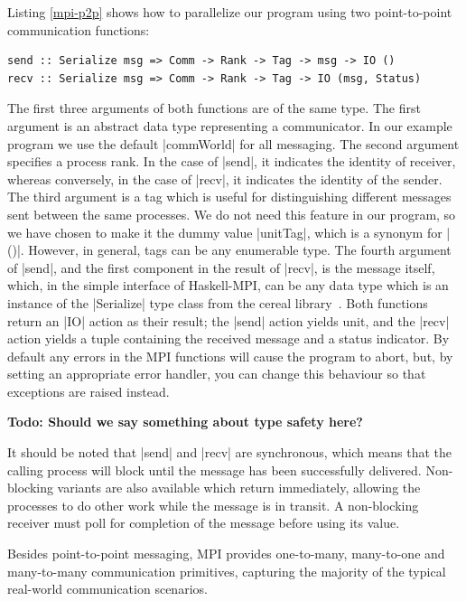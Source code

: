 \documentclass{tmr}
\newcommand{\Todo}[1]{{\textbf{Todo: #1}}}
\begin{document}
Listing \ref{mpi-p2p} shows how to parallelize our program using
two point-to-point communication functions:
\begin{Verbatim}
send :: Serialize msg => Comm -> Rank -> Tag -> msg -> IO ()
recv :: Serialize msg => Comm -> Rank -> Tag -> IO (msg, Status)
\end{Verbatim}
The first three arguments of both functions are of the same type.
The first argument is an abstract data
type representing a communicator. In our example program we use
the default |commWorld| for all messaging. The second argument
specifies a process rank. In the case of |send|, it indicates
the identity of receiver, whereas conversely, in the case
of |recv|, it indicates the identity of the sender.
The third argument is a tag which is useful for distinguishing
different messages sent between the same processes.
We do not need this feature in our program, so we have chosen
to make it the dummy value |unitTag|, which is a synonym for |()|.
However, in general, tags can be any enumerable type.
The fourth argument of |send|, and the first component in
the result of |recv|, is the message itself, which,
in the simple interface of Haskell-MPI, can be any
data type which is an instance of the |Serialize| type class
from the cereal library~\cite{cereal}. Both functions return
an |IO| action as their result; the |send| action yields
unit, and the |recv| action yields a tuple containing
the received message and a status indicator.
By default any errors in
the MPI functions will cause the program to abort, but, by
setting an appropriate error handler, you can
change this behaviour so that exceptions are raised instead.

\Todo{Should we say something about type safety here?}

It should be noted that |send| and |recv| are synchronous,
which means that the calling process will block until the message has been
successfully delivered. Non-blocking variants are also available which
return immediately, allowing the processes to do other work while
the message is in transit. A non-blocking receiver must poll for
completion of the message before using its value.

Besides point-to-point messaging, MPI
provides one-to-many, many-to-one and many-to-many communication
primitives, capturing the majority of the typical real-world communication
scenarios.
\end{document}

